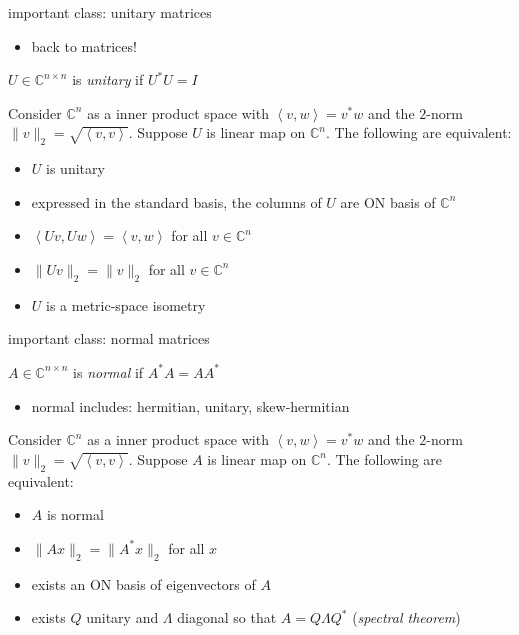 \documentclass[10pt,hyperref]{beamer}
\newcommand{\CC}{\mathbb{C}}
\newcommand{\ip}[2]{\left<#1,#2\right>}
\begin{document}
\begin{frame}{important class: unitary matrices}

\begin{itemize}
\item back to matrices!
\end{itemize}

\begin{definition}
$U \in \CC^{n\times n}$ is \emph{unitary} if $U^*U=I$
\end{definition}

\begin{lemma}
Consider $\CC^n$ as a inner product space with $\ip{v}{w}=v^*w$ and the $2$-norm $\|v\|_2 = \sqrt{\ip v v}$.  Suppose $U$ is linear map on $\CC^n$.  The following are equivalent:

\begin{itemize}
\item $U$ is unitary
\item expressed in the standard basis, the columns of $U$ are ON basis of $\CC^n$
\item $\ip{Uv}{Uw}=\ip{v}{w}$ for all $v\in\CC^n$
\item $\|Uv\|_2=\|v\|_2$ for all $v\in\CC^n$
\item $U$ is a metric-space isometry
\end{itemize}
\end{lemma}
\end{frame}


\begin{frame}{important class: normal matrices}

\begin{definition}
$A \in \CC^{n\times n}$ is \emph{normal} if $A^*A=AA^*$
\end{definition}

\begin{itemize}
\item normal includes: hermitian, unitary, skew-hermitian
\end{itemize}

\begin{lemma}
Consider $\CC^n$ as a inner product space with $\ip{v}{w}=v^*w$ and the $2$-norm $\|v\|_2 = \sqrt{\ip v v}$.  Suppose $A$ is linear map on $\CC^n$.  The following are equivalent:

\begin{itemize}
\item $A$ is normal
\item $\|Ax\|_2 = \|A^*x\|_2$ for all $x$
\item exists an ON basis of eigenvectors of $A$
\item exists $Q$ unitary and $\Lambda$ diagonal so that $A=Q\Lambda Q^*$ (\emph{spectral theorem})
\end{itemize}
\end{lemma}
\end{frame}
\end{document}
